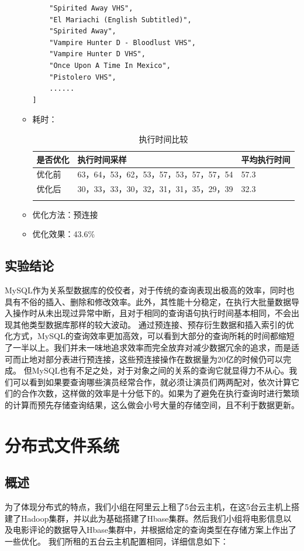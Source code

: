 \documentclass{ctexrep}
\begin{document}
\begin{enumerate}
\begin{itemize}
\begin{lstlisting}
    "Spirited Away VHS",
    "El Mariachi (English Subtitled)",
    "Spirited Away",
    "Vampire Hunter D - Bloodlust VHS",
    "Vampire Hunter D VHS",
    "Once Upon A Time In Mexico",
    "Pistolero VHS",
    ......
]
    	                \end{lstlisting}
    	            \item 耗时：
    	                \begin{longtable}{l|p{5cm}|l}
    	                    \hline
    	                    是否优化 & 执行时间采样 & 平均执行时间\\
    	                    \hline
    	                    \hline
    	                    优化前 & 63，64，53，62，53，57，53，57，57，54 & 57.3\\
    	                    优化后 & 30，33，33，30，32，31，31，35，29，39 & 32.3\\
    	                    \hline
    	                    \caption{执行时间比较}
    	                \end{longtable}
    	            \item 优化方法：预连接
    	            \item 优化效果：43.6\%
    	        \end{itemize}
	    \end{enumerate}
	\subsection{实验结论}
	MySQL作为关系型数据库的佼佼者，对于传统的查询表现出极高的效率，同时也具有不俗的插入、删除和修改效率。此外，其性能十分稳定，在执行大批量数据导入操作时从未出现过异常中断，且对于相同的查询语句执行时间基本相同，不会出现其他类型数据库那样的较大波动。
    通过预连接、预存衍生数据和插入索引的优化方式，MySQL的查询效率更加高效，可以看到大部分的查询所耗的时间都缩短了一半以上。我们并未一味地追求效率而完全放弃对减少数据冗余的追求，而是适可而止地对部分表进行预连接，这些预连接操作在数据量为20亿的时候仍可以完成。
    但MySQL也有不足之处，对于对象之间的关系的查询它就显得力不从心。我们可以看到如果要查询哪些演员经常合作，就必须让演员们两两配对，依次计算它们的合作次数，这样做的效率是十分低下的。如果为了避免在执行查询时进行繁琐的计算而预先存储查询结果，这么做会小号大量的存储空间，且不利于数据更新。
	
	\section{分布式文件系统}
	\subsection{概述}
	为了体现分布式的特点，我们小组在阿里云上租了5台云主机，在这5台云主机上搭建了Hadoop集群，并以此为基础搭建了Hbase集群。然后我们小组将电影信息以及电影评论的数据导入Hbase集群中，并根据给定的查询类型在存储方案上作出了一些优化。
	我们所租的五台云主机配置相同，详细信息如下：
\end{document}
